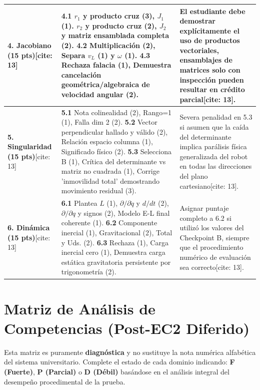 \documentclass[11pt, a4paper, landscape]{article}
\begin{document}
{\begin{tabularx}{\textwidth}{|>{\hsize=0.6\hsize\raggedright\arraybackslash}X|>{\hsize=1.2\hsize\raggedright\arraybackslash}X|>{\hsize=1.2\hsize\raggedright\arraybackslash}X|}
\textbf{4. Jacobiano (15 pts)}[cite: 13] & 
\textbf{4.1} $r_1$ y producto cruz (3), $J_1$ (1). $r_2$ y producto cruz (2), $J_2$ y matriz ensamblada completa (2). \newline
\textbf{4.2} Multiplicación (2), Separa $v_L$ (1) y $\omega$ (1). \newline
\textbf{4.3} Rechaza falacia (1), Demuestra cancelación geométrica/algebraica de velocidad angular (2). & 
El estudiante debe demostrar explícitamente el uso de productos vectoriales, ensamblajes de matrices solo con inspección pueden resultar en crédito parcial[cite: 13]. \\ \hline

\textbf{5. Singularidad (15 pts)}[cite: 13] & 
\textbf{5.1} Nota colinealidad (2), Rango=1 (1), Falla dim 2 (2). \newline
\textbf{5.2} Vector perpendicular hallado y válido (2), Relación espacio columna (1), Significado físico (2). \newline
\textbf{5.3} Selecciona B (1), Crítica del determinante vs matriz no cuadrada (1), Corrige 'inmovilidad total' demostrando movimiento residual (3). & 
Severa penalidad en 5.3 si asumen que la caída del determinante implica parálisis física generalizada del robot en todas las direcciones del plano cartesiano[cite: 13]. \\ \hline

\textbf{6. Dinámica (15 pts)}[cite: 13] & 
\textbf{6.1} Plantea $L$ (1), $\partial/\partial \dot{q}$ y $d/dt$ (2), $\partial/\partial q$ y signos (2), Modelo E-L final coherente (1). \newline
\textbf{6.2} Componente inercial (1), Gravitacional (2), Total y Uds. (2). \newline
\textbf{6.3} Rechaza (1), Carga inercial cero (1), Demuestra carga estática gravitatoria persistente por trigonometría (2). & 
Asignar puntaje completo a 6.2 si utilizó los valores del Checkpoint B, siempre que el procedimiento numérico de evaluación sea correcto[cite: 13]. \\ \hline

\end{tabularx}
}

\newpage
\section*{Matriz de Análisis de Competencias (Post-EC2 Diferido)}

\begin{tcolorbox}[colback=white, colframe=black, title=\textbf{Instrucción de Registro Docente}, left=1mm, right=1mm, top=1mm, bottom=1mm]
    \small Esta matriz es puramente \textbf{diagnóstica} y no sustituye la nota numérica alfabética del sistema universitario. Complete el estado de cada dominio indicando: \textbf{F (Fuerte)}, \textbf{P (Parcial)} o \textbf{D (Débil)} basándose en el análisis integral del desempeño procedimental de la prueba.
\end{tcolorbox}
\end{document}
